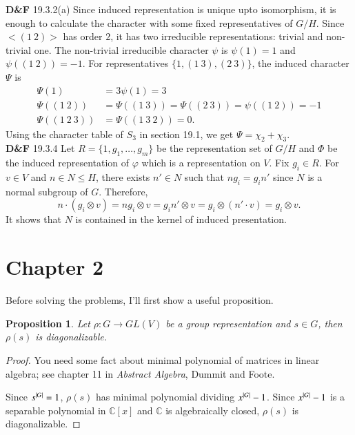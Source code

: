 \documentclass[a4paper, 12pt]{article}
\theoremstyle{Mydefinition}
\theoremstyle{Mytheorem}
\newtheorem{proposition}[statement]{Proposition}
\begin{document}
\noindent \textbf{D\&F} 19.3.2(a)
Since induced representation is unique upto isomorphism, it is enough to calculate the character with some fixed representatives of $G/H$. Since $<(1~2)>$ has order $2$, it has two irreducible representations: trivial and non-trivial one. The non-trivial irreducible character $\psi$ is $\psi(1)=1$ and $\psi((1~2)) = -1$. For representatives $\{1, (1~3),(2~3)\}$, the induced character $\Psi$ is
\begin{equation}
    \begin{split}
        \Psi(1) &= 3\psi(1) = 3\\
        \Psi((1~2)) &= \Psi((1~3)) = \Psi((2~3)) = \psi((1~2)) = -1\\
        \Psi((1~2~3)) &= \Psi((1~3~2)) =0.
    \end{split}
\end{equation}
Using the character table of $S_3$ in section 19.1, we get $\Psi = \chi_2+\chi_3$.\\

\noindent \textbf{D\&F} 19.3.4
Let $R = \{1, g_1, \ldots, g_m\}$ be the representation set of $G/H$ and $\Phi$ be the induced representation of $\varphi$ which is a representation on $V$. Fix $g_i\in R$. For $v\in V$ and $n\in N\leq H$, there exists $n'\in N$ such that $ng_i = g_in'$ since $N$ is a normal subgroup of $G$. Therefore,
\begin{equation}
    n\cdot(g_i\otimes v) = ng_i\otimes v = g_in'\otimes v = g_i\otimes (n'\cdot v) =g_i\otimes v.
\end{equation}
It shows that $N$ is contained in the kernel of induced presentation.\\

\newpage
\section{Chapter 2}
Before solving the problems, I'll first show a useful proposition.
\begin{proposition}
Let $\rho:G\rightarrow GL(V)$ be a group representation and $s\in G$, then $\rho(s)$ is diagonalizable.
\end{proposition}
\begin{proof}
You need some fact about minimal polynomial of matrices in linear algebra; see chapter 11 in \textit{Abstract Algebra}, Dummit and Foote.

Since $s^{\abs{G}} = 1$, $\rho(s)$ has minimal polynomial dividing $x^{\abs{G}}-1$. Since $x^{\abs{G}}-1$ is a separable polynomial in $\mathbb{C}[x]$ and $\mathbb{C}$ is algebraically closed, $\rho(s)$ is diagonalizable.
\end{proof}
\end{document}
